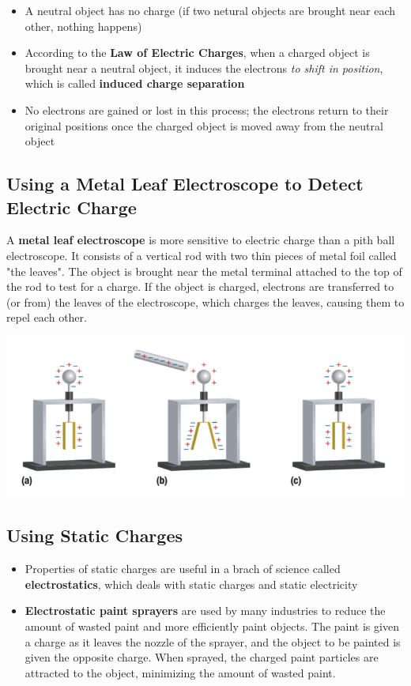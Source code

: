 \documentclass{article}
\begin{document}
    \begin{itemize}
        \item A neutral object has no charge (if two netural objects are brought near each other, nothing happens)
        \item According to the \textbf{Law of Electric Charges}, when a charged object is brought near a neutral object, it induces the electrons \textit{to shift in position}, which is called \textbf{induced charge separation}
        \item No electrons are gained or lost in this process; the electrons return to their original positions once the charged object is moved away from the neutral object
    \end{itemize} 

    \subsection*{Using a Metal Leaf Electroscope to Detect Electric Charge}

    A \textbf{metal leaf electroscope} is more sensitive to electric charge than a pith ball electroscope.
    It consists of a vertical rod with two thin pieces of metal foil called "the leaves". The object is brought near the metal terminal attached to the top of the rod to test for a charge. If the object is charged, electrons are transferred to (or from) the leaves of the electroscope, which charges the leaves, causing them to repel each other.
    \begin{center}
    \includegraphics[scale = 0.6]{metal leaf electroscope}
    \end{center}

    \subsection*{Using Static Charges}
    
    \begin{itemize}
        \item Properties of static charges are useful in a brach of science called \textbf{electrostatics}, which deals with static charges and static electricity
        \item \textbf{Electrostatic paint sprayers} are used by many industries to reduce the amount of wasted paint and more efficiently paint objects. The paint is given a charge as it leaves the nozzle of the sprayer, and the object to be painted is given the opposite charge. When sprayed, the charged paint particles are attracted to the object, minimizing the amount of wasted paint.
    \end{itemize}
\end{document}
